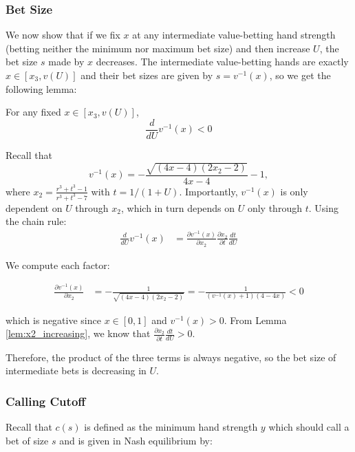 \documentclass[../../main/main.tex]{subfiles}
\begin{document}
\subsubsection{Bet Size}

We now show that if we fix $x$ at any intermediate value-betting hand strength (betting neither the minimum nor maximum bet size) and then increase $U$, the bet size $s$ made by $x$ decreases. The intermediate value-betting hands are exactly $x \in [x_3, v(U)]$ and their bet sizes are given by $s = v^{-1}(x)$, so we get the following lemma:

\begin{lemma}
    \label{lem:v_inverse_decreasing}
    For any fixed $x \in [x_3, v(U)]$, 
    \[ 
        \frac{d}{dU} v^{-1}(x) < 0
    \]
\end{lemma}

\begin{customproof}
    Recall that
    $$v^{-1}(x) = -\frac{\sqrt{(4 x-4) (2 x_2-2)}}{4 x-4}-1,$$
    where $x_2 = \frac{r^3 + t^3 - 1}{r^3 + t^3 - 7}$ with $t = 1/(1+U)$. Importantly, $v^{-1}(x)$ is only dependent on $U$ through $x_2$, which in turn depends on $U$ only through $t$. Using the chain rule:
    \begin{align*}
        \frac{d}{dU} v^{-1}(x) & = \frac{\partial v^{-1}(x)}{\partial x_2} \frac{\partial x_2}{\partial t} \frac{dt}{dU}
    \end{align*}

    We compute each factor:

\begin{align*}
    \frac{\partial v^{-1}(x)}{\partial x_2} & = - \frac{1}{\sqrt{(4 x-4) (2 x_2-2)}} = - \frac{1}{(v^{-1}(x)+1)(4-4x)} < 0
\end{align*}

    which is negative since $x \in [0, 1]$ and $v^{-1}(x) >0$. From Lemma \ref{lem:x2_increasing}, we know that $\frac{\partial x_2}{\partial t} \frac{dt}{dU} > 0$.

    Therefore, the product of the three terms is always negative, so the bet size of intermediate bets is decreasing in $U$.
\end{customproof}

\subsubsection{Calling Cutoff}

Recall that $c(s)$ is defined as the minimum hand strength $y$ which should call a bet of size $s$ and is given in Nash equilibrium by:
\end{document}
